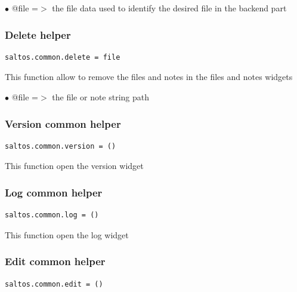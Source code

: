 \documentclass[a4paper]{article}
\begin{document}
\begin{compactitem}
\item[\color{myblue}$\bullet$] @file =$>$ the file data used to identify the desired file in the backend part
\end{compactitem}

\hypertarget{toc123}{}
\subsubsection{Delete helper}

\begin{lstlisting}
saltos.common.delete = file
\end{lstlisting}

This function allow to remove the files and notes in the files and notes widgets

\begin{compactitem}
\item[\color{myblue}$\bullet$] @file =$>$ the file or note string path
\end{compactitem}

\hypertarget{toc124}{}
\subsubsection{Version common helper}

\begin{lstlisting}
saltos.common.version = ()
\end{lstlisting}

This function open the version widget

\hypertarget{toc125}{}
\subsubsection{Log common helper}

\begin{lstlisting}
saltos.common.log = ()
\end{lstlisting}

This function open the log widget

\hypertarget{toc126}{}
\subsubsection{Edit common helper}

\begin{lstlisting}
saltos.common.edit = ()
\end{lstlisting}
\end{document}
